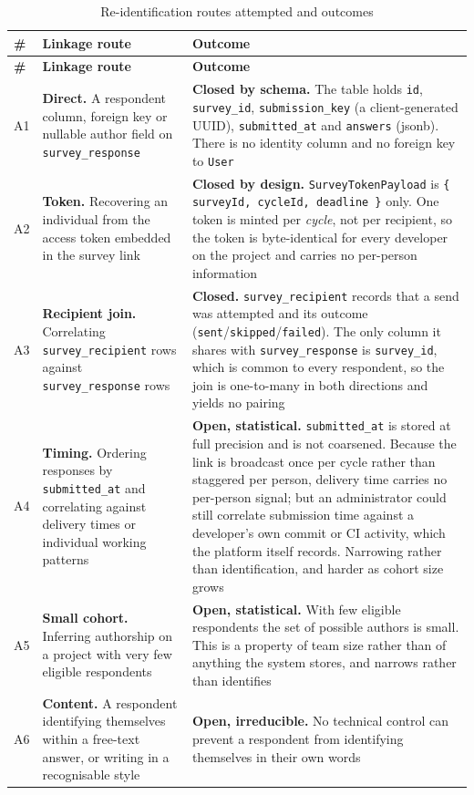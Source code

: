 \begin{longtable}{
  >{\raggedright\arraybackslash}p{}
  >{\raggedright\arraybackslash}p{}
  >{\raggedright\arraybackslash}p{}
}
\caption{Re-identification routes attempted and outcomes}
\label{tab:anonymity}\\
\toprule
\textbf{\#} & \textbf{Linkage route} & \textbf{Outcome} \\
\midrule
\endfirsthead
\toprule
\textbf{\#} & \textbf{Linkage route} & \textbf{Outcome} \\
\midrule
\endhead
\bottomrule
\endlastfoot
A1 & \textbf{Direct.} A respondent column, foreign key or nullable author field
on \texttt{survey\_response} & \textbf{Closed by schema.} The table holds
\texttt{id}, \texttt{survey\_id}, \texttt{submission\_key} (a client-generated
UUID), \texttt{submitted\_at} and \texttt{answers} (jsonb). There is no identity
column and no foreign key to \texttt{User} \\
\addlinespace
A2 & \textbf{Token.} Recovering an individual from the access token embedded in
the survey link & \textbf{Closed by design.} \texttt{SurveyTokenPayload} is
\texttt{\{ surveyId, cycleId, deadline \}} only. One token is minted per
\emph{cycle}, not per recipient, so the token is byte-identical for every
developer on the project and carries no per-person information \\
\addlinespace
A3 & \textbf{Recipient join.} Correlating \texttt{survey\_recipient} rows
against \texttt{survey\_response} rows & \textbf{Closed.}
\texttt{survey\_recipient} records that a send was attempted and its outcome
(\texttt{sent}/\texttt{skipped}/\texttt{failed}). The only column it shares with
\texttt{survey\_response} is \texttt{survey\_id}, which is common to every
respondent, so the join is one-to-many in both directions and yields no
pairing \\
\addlinespace
A4 & \textbf{Timing.} Ordering responses by \texttt{submitted\_at} and
correlating against delivery times or individual working patterns &
\textbf{Open, statistical.} \texttt{submitted\_at} is stored at full precision
and is not coarsened. Because the link is broadcast once per cycle rather than
staggered per person, delivery time carries no per-person signal; but an
administrator could still correlate submission time against a developer's own
commit or CI activity, which the platform itself records. Narrowing rather than
identification, and harder as cohort size grows \\
\addlinespace
A5 & \textbf{Small cohort.} Inferring authorship on a project with very few
eligible respondents & \textbf{Open, statistical.} With few eligible respondents
the set of possible authors is small. This is a property of team size rather
than of anything the system stores, and narrows rather than identifies \\
\addlinespace
A6 & \textbf{Content.} A respondent identifying themselves within a free-text
answer, or writing in a recognisable style & \textbf{Open, irreducible.} No
technical control can prevent a respondent from identifying themselves in their
own words \\
\end{longtable}

